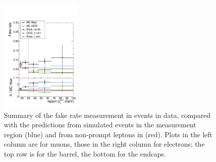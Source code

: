 \begin{figure}[htb]
\includegraphics[width=0.35\textwidth]{plots_fakerate/measurement/fr_el_endcap}
    \caption{Summary of the fake rate measurement in events in data, compared with the predictions from simulated events in the measurement region (blue) and from non-prompt leptons in \ttbar (red). Plots in the left column are for muons, those in the right column for electrons; the top row is for the barrel, the bottom for the endcaps. }
\label{fig:frmeas-comb-data}
\end{figure}
